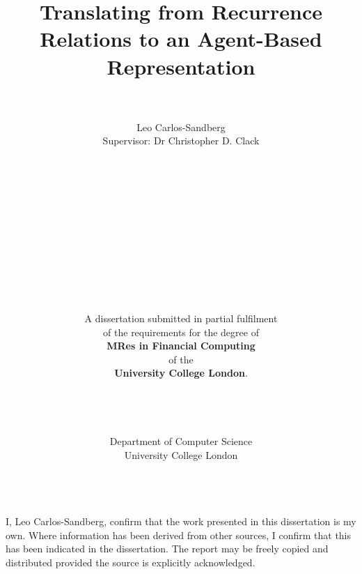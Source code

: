 \documentclass{article}
\begin{document}
 
\title{Translating from Recurrence Relations to an Agent-Based Representation} 
\author{
\\
\\
Leo Carlos-Sandberg\\
Supervisor: Dr Christopher D. Clack\\
\\
\\
\\
\\
\\
\\
\\
\\
\\
\\
\\
\\
A dissertation submitted in partial fulfilment\\
 of the requirements for the degree of\\
 \textbf{MRes in Financial Computing}\\
 of the \\
 \textbf{University College London}.
 \\
 \\
 \\
 \\
 \\
 Department of Computer Science\\
 University College London
 \\
 \\} 
\maketitle 

\newpage
I, Leo Carlos-Sandberg, confirm that the work presented in this dissertation is my own. Where information has been derived from other sources, I confirm that this has been indicated in the dissertation. The report may be freely copied and distributed provided the source is explicitly acknowledged.


\end{document}
